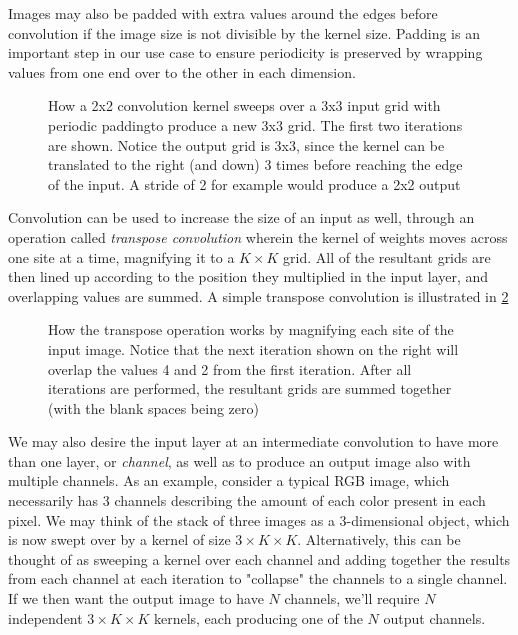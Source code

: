 \documentclass[12pt]{article}
\begin{document}
Images may also be padded with extra values around the edges before convolution if the image size is not divisible by the kernel size. Padding 
is an important step in our use case to ensure periodicity is preserved by wrapping values from one end over to the other in each dimension.

\begin{figure}[h]
	\begin{center}
	
	\end{center}
	\caption{How a 2x2 convolution kernel sweeps over a 3x3 input grid with periodic paddingto produce a new 3x3 grid. The first two iterations are shown.
	Notice the output grid is 3x3, since the kernel can be translated to the right (and down) 3 times before reaching the edge of the input.
	A stride of 2 for example would produce a 2x2 output}
	\label{fig:conv2d}
\end{figure}

Convolution can be used to increase the size of an input as well, through an operation called \textit{transpose convolution} wherein the kernel of weights
moves across one site at a time, magnifying it to a $K \times K$ grid. All of the resultant grids are then lined up according to the position they 
multiplied in the input layer, and overlapping values are summed. A simple transpose convolution is illustrated in \ref{fig:transconv2d}

\begin{figure}[h]
	\begin{center}
	
	\end{center}
	\caption{How the transpose operation works by magnifying each site of the input image. Notice that the next iteration shown 
	on the right will overlap the values 4 and 2 from the first iteration. After all iterations are performed, the resultant
	grids are summed together (with the blank spaces being zero)}
	\label{fig:transconv2d}
\end{figure}

We may also desire the input layer at an intermediate convolution to have more than one layer, or \textit{channel}, as well as to produce an output image also
with multiple channels. As an example, consider a typical RGB image, which necessarily has 3 channels describing the amount of each color present in each pixel.
We may think of the stack of three images as a 3-dimensional object, which is now swept over by a kernel of size $3\times K\times K$. Alternatively, this can be thought of
as sweeping a kernel over each channel and adding together the results from each channel at each iteration to "collapse" the channels to a single channel. If we then
want the output image to have $N$ channels, we'll require $N$ independent $3\times K\times K$ kernels, each producing one of the $N$ output channels.
\end{document}
